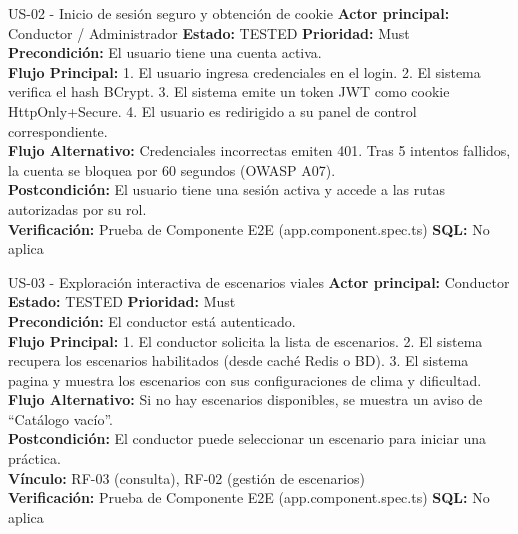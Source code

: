 \documentclass[11pt,a4paper]{article}
\begin{document}
\begin{requisito}{US-02 - Inicio de sesión seguro y obtención de cookie}
    \textbf{Actor principal:} Conductor / Administrador \quad \textbf{Estado:} TESTED \quad \textbf{Prioridad:} Must\\[0.2cm]
    \textbf{Precondición:} El usuario tiene una cuenta activa.\\[0.2cm]
    \textbf{Flujo Principal:} 1. El usuario ingresa credenciales en el login. 2. El sistema verifica el hash BCrypt. 3. El sistema emite un token JWT como cookie HttpOnly+Secure. 4. El usuario es redirigido a su panel de control correspondiente. \\[0.2cm]
    \textbf{Flujo Alternativo:} Credenciales incorrectas emiten 401. Tras 5 intentos fallidos, la cuenta se bloquea por 60 segundos (OWASP A07).\\[0.2cm]
    \textbf{Postcondición:} El usuario tiene una sesión activa y accede a las rutas autorizadas por su rol. \\[0.2cm]
    \textbf{Verificación:} Prueba de Componente E2E (app.component.spec.ts) \quad \textbf{SQL:} No aplica
\end{requisito}

\begin{requisito}{US-03 - Exploración interactiva de escenarios viales}
    \textbf{Actor principal:} Conductor \quad \textbf{Estado:} TESTED \quad \textbf{Prioridad:} Must\\[0.2cm]
    \textbf{Precondición:} El conductor está autenticado.\\[0.2cm]
    \textbf{Flujo Principal:} 1. El conductor solicita la lista de escenarios. 2. El sistema recupera los escenarios habilitados (desde caché Redis o BD). 3. El sistema pagina y muestra los escenarios con sus configuraciones de clima y dificultad. \\[0.2cm]
    \textbf{Flujo Alternativo:} Si no hay escenarios disponibles, se muestra un aviso de ``Catálogo vacío''.\\[0.2cm]
    \textbf{Postcondición:} El conductor puede seleccionar un escenario para iniciar una práctica. \\[0.2cm]
    \textbf{Vínculo:} RF-03 (consulta), RF-02 (gestión de escenarios) \\[0.2cm]
    \textbf{Verificación:} Prueba de Componente E2E (app.component.spec.ts) \quad \textbf{SQL:} No aplica
\end{requisito}
\end{document}
